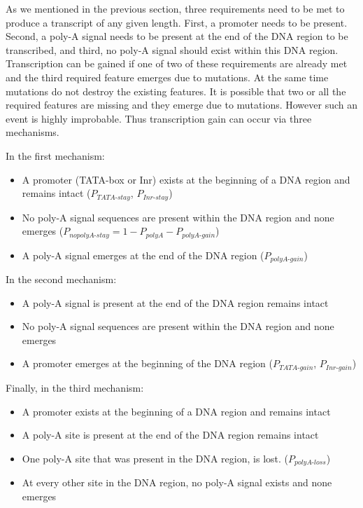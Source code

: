 \documentclass[12pt,a4paper]{article}
\begin{document}
As we mentioned in the previous section, three requirements need to be met to produce a transcript of any given length. First, a promoter needs to be present. Second, a poly-A signal needs to be present at the end of the DNA region to be transcribed, and third, no poly-A signal should exist within this DNA region. Transcription can be gained if one of two of these requirements are already met and the third required feature emerges due to mutations. At the same time mutations do not destroy the existing features. It is possible that two or all the required features are missing and they emerge due to mutations. However such an event is highly improbable. Thus transcription gain can occur via three mechanisms.

\vspace{\baselineskip}
In the first mechanism:
\begin{itemize}
\item A promoter (TATA-box or Inr) exists at the beginning of a DNA region and remains intact ($P_\textit{TATA-stay}$, $P_\textit{Inr-stay}$)
\item No poly-A signal sequences are present within the DNA region and none emerges ($P_\textit{nopolyA-stay} = 1 - P_\textit{polyA} - P_\textit{polyA-gain}$)
\item A poly-A signal emerges at the end of the DNA region ($P_\textit{polyA-gain}$)
\end{itemize}

\vspace{\baselineskip}
In the second mechanism:
\begin{itemize}
\item A poly-A signal is present at the end of the DNA region remains intact 
\item No poly-A signal sequences are present within the DNA region and none emerges
\item A promoter emerges at the beginning of the DNA region ($P_\textit{TATA-gain}$, $P_\textit{Inr-gain}$)
\end{itemize}

\vspace{\baselineskip}
Finally, in the third mechanism:
\begin{itemize}
\item A promoter exists at the beginning of a DNA region and remains intact
\item A poly-A site is present at the end of the DNA region remains intact
\item One poly-A site that was present in the DNA region, is lost. ($P_\textit{polyA-loss}$)
\item At every other site in the DNA region, no poly-A signal exists and none emerges
\end{itemize}
\end{document}
